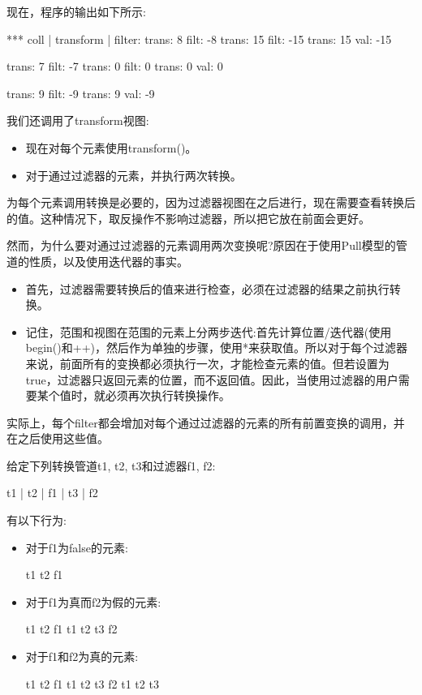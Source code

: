 现在，程序的输出如下所示:

\begin{shell}
*** coll | transform | filter:
trans: 8
filt: -8
trans: 15
filt: -15
trans: 15
val: -15

trans: 7
filt: -7
trans: 0
filt: 0
trans: 0
val: 0

trans: 9
filt: -9
trans: 9
val: -9
\end{shell}

我们还调用了transform视图:

\begin{itemize}
\item
现在对每个元素使用transform()。

\item
对于通过过滤器的元素，并执行两次转换。
\end{itemize}

为每个元素调用转换是必要的，因为过滤器视图在之后进行，现在需要查看转换后的值。这种情况下，取反操作不影响过滤器，所以把它放在前面会更好。

然而，为什么要对通过过滤器的元素调用两次变换呢?原因在于使用Pull模型的管道的性质，以及使用迭代器的事实。

\begin{itemize}
\item
首先，过滤器需要转换后的值来进行检查，必须在过滤器的结果之前执行转换。
	
\item
记住，范围和视图在范围的元素上分两步迭代:首先计算位置/迭代器(使用begin()和++)，然后作为单独的步骤，使用*来获取值。所以对于每个过滤器来说，前面所有的变换都必须执行一次，才能检查元素的值。但若设置为true，过滤器只返回元素的位置，而不返回值。因此，当使用过滤器的用户需要某个值时，就必须再次执行转换操作。
\end{itemize}

实际上，每个filter都会增加对每个通过过滤器的元素的所有前置变换的调用，并在之后使用这些值。

给定下列转换管道t1, t2, t3和过滤器f1, f2:

\begin{cpp}
t1 | t2 | f1 | t3 | f2
\end{cpp}

有以下行为:

\begin{itemize}
\item
对于f1为false的元素:

\begin{cpp}
t1 t2 f1
\end{cpp}

\item
对于f1为真而f2为假的元素:

\begin{cpp}
t1 t2 f1 t1 t2 t3 f2
\end{cpp}

\item
对于f1和f2为真的元素:

\begin{cpp}
t1 t2 f1 t1 t2 t3 f2 t1 t2 t3
\end{cpp}
\end{itemize}

